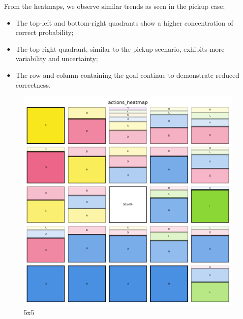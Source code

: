 From the heatmaps, we observe similar trends as seen in the pickup case:
\begin{itemize}
  \item The top-left and bottom-right quadrants show a higher concentration of correct
    probability;

  \item The top-right quadrant, similar to the pickup scenario, exhibits more variability
    and uncertainty;

  \item The row and column containing the goal continue to demonstrate reduced correctness.
\end{itemize}

\vspace{5mm}
\begin{figure}[h!]
  \centering
  \begin{minipage}[b]{0.32\textwidth}
    \centering
    \includegraphics[width=\textwidth]{
      images/results_discussion/stateless/hm_5x5_deliver.png
    }
    \caption{5x5}
    \label{fig:hm_5x5_deliver}
  \end{minipage}
  \hfill
  \begin{minipage}[b]{0.32\textwidth}
    \centering

\end{minipage}
\end{figure}
